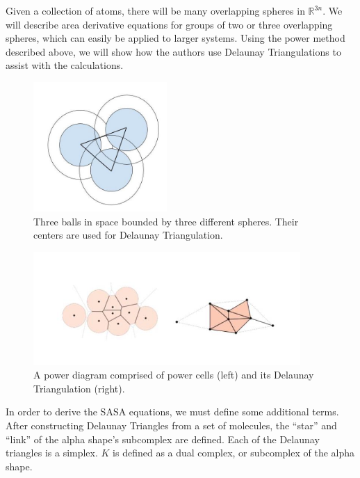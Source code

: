 \documentclass{article}
\newcommand{\R}{\mathbb{R}}
\begin{document}
Given a collection of atoms, there will be many overlapping spheres in $\R^{3n}$. We will describe area derivative equations for groups of two or three overlapping spheres, which can easily be applied to larger systems. Using the power method described above, we will show how the authors use Delaunay Triangulations to assist with the calculations.

\begin{figure}[h!]
\caption{Three balls in space bounded by three different spheres. Their centers are used for Delaunay Triangulation.}
\centerline{\includegraphics[width=2in]{Figure2}}
\end{figure}


\begin{figure}[h!]
\caption{A power diagram comprised of power cells (left) and its Delaunay Triangulation (right).\cite{Bryant}}
\centerline{\includegraphics[width=4in]{Figure4}}
\end{figure}


In order to derive the SASA equations, we must define some additional terms. After constructing Delaunay Triangles from a set of molecules, the “star” and “link” of the alpha shape's subcomplex are defined. Each of the Delaunay triangles is a simplex. $K$ is defined as a dual complex, or subcomplex of the alpha shape.
\end{document}
